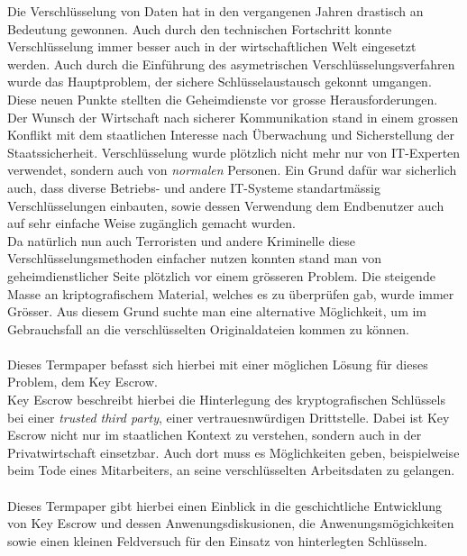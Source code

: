 Die Verschlüsselung von Daten hat in den vergangenen Jahren drastisch an Bedeutung gewonnen. Auch durch den technischen Fortschritt konnte Verschlüsselung immer besser auch in der wirtschaftlichen Welt eingesetzt werden. Auch durch die Einführung des asymetrischen Verschlüsselungsverfahren wurde das Hauptproblem, der sichere Schlüsselaustausch gekonnt umgangen. \\
Diese neuen Punkte stellten die Geheimdienste vor grosse Herausforderungen. Der Wunsch der Wirtschaft nach sicherer Kommunikation stand in einem grossen Konflikt mit dem staatlichen Interesse nach Überwachung und Sicherstellung der Staatssicherheit. Verschlüsselung wurde plötzlich nicht mehr nur von IT-Experten verwendet, sondern auch von \textit{normalen} Personen. Ein Grund dafür war sicherlich auch, dass diverse Betriebs- und andere IT-Systeme standartmässig Verschlüsselungen einbauten, sowie dessen Verwendung dem Endbenutzer auch auf sehr einfache Weise zugänglich gemacht wurden. \\
Da natürlich nun auch Terroristen und andere Kriminelle diese Verschlüsselungsmethoden einfacher nutzen konnten stand man von geheimdienstlicher Seite plötzlich vor einem grösseren Problem. Die steigende Masse an kriptografischem Material, welches es zu überprüfen gab, wurde immer Grösser. Aus diesem Grund suchte man eine alternative Möglichkeit, um im Gebrauchsfall an die verschlüsselten Originaldateien kommen zu können. \\
\\
Dieses Termpaper befasst sich hierbei mit einer möglichen Lösung für dieses Problem, dem Key Escrow.\\
Key Escrow beschreibt hierbei die Hinterlegung des kryptografischen Schlüssels bei einer \textit{trusted third party}, einer vertrauesnwürdigen Drittstelle. Dabei ist Key Escrow nicht nur im staatlichen Kontext zu verstehen, sondern auch in der Privatwirtschaft einsetzbar. Auch dort muss es Möglichkeiten geben, beispielweise beim Tode eines Mitarbeiters, an seine verschlüsselten Arbeitsdaten zu gelangen. \\
\\
Dieses Termpaper gibt hierbei einen Einblick in die geschichtliche Entwicklung von Key Escrow und dessen Anwenungsdiskusionen, die Anwenungsmögichkeiten sowie einen kleinen Feldversuch für den Einsatz von hinterlegten Schlüsseln.

